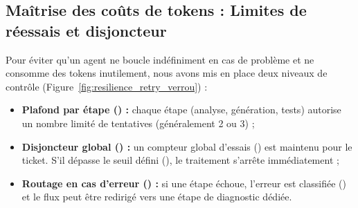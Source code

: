 \documentclass{tnreport}
\begin{document}
\subsection{Maîtrise des coûts de tokens : Limites de réessais et disjoncteur}
\label{subsec:gestion_couts_tokens}

Pour éviter qu'un agent ne boucle indéfiniment en cas de problème et ne consomme des tokens inutilement, nous avons mis en place deux niveaux de contrôle (Figure~\ref{fig:resilience_retry_verrou}) :
\begin{itemize}
    \item \textbf{Plafond par étape () :} chaque étape (analyse, génération, tests) autorise un nombre limité de tentatives (généralement 2 ou 3) ;
    \item \textbf{Disjoncteur global () :} un compteur global d'essais () est maintenu pour le ticket. S'il dépasse le seuil défini (), le traitement s'arrête immédiatement ;
    \item \textbf{Routage en cas d'erreur () :} si une étape échoue, l'erreur est classifiée () et le flux peut être redirigé vers une étape de diagnostic dédiée.
\end{itemize}
\end{document}

